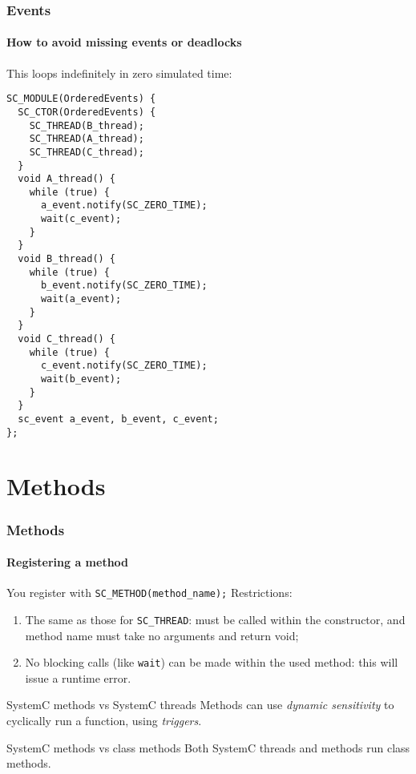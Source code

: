 \begin{frame}[fragile]
\frametitle{Events}
\framesubtitle{How to avoid missing events or deadlocks}

\begin{block}{This loops indefinitely in zero simulated time:}
\vspace{-1em}
{\tiny 
\begin{verbatim}
SC_MODULE(OrderedEvents) {
  SC_CTOR(OrderedEvents) {
    SC_THREAD(B_thread);
    SC_THREAD(A_thread);
    SC_THREAD(C_thread);
  }
  void A_thread() {
    while (true) {
      a_event.notify(SC_ZERO_TIME);
      wait(c_event);
    }
  }
  void B_thread() {
    while (true) {
      b_event.notify(SC_ZERO_TIME);
      wait(a_event);
    }
  }
  void C_thread() {
    while (true) {
      c_event.notify(SC_ZERO_TIME);
      wait(b_event);
    }
  }  
  sc_event a_event, b_event, c_event;
};
\end{verbatim}
}
\vspace{-1em}
\end{block}
\end{frame}

\section{Methods}

\begin{frame}
\frametitle{Methods}
\framesubtitle{Registering a method}

\begin{block}{You register with \texttt{SC\_METHOD(method\_name);}}
Restrictions:
\begin{enumerate}
\item The same as those for \texttt{SC\_THREAD}: must be called within the constructor, and method name must take no arguments and return void;
\item No blocking calls (like \texttt{wait}) can be made within the used method: this will issue a runtime error.
\end{enumerate}
\end{block}
\pause
\begin{block}{SystemC methods vs SystemC threads}
Methods can use {\em dynamic sensitivity} to cyclically run a function, using {\em triggers}.
\end{block}
\pause
\begin{block}{SystemC methods vs class methods}
Both SystemC threads and methods run class methods.
\end{block}
\end{frame}

